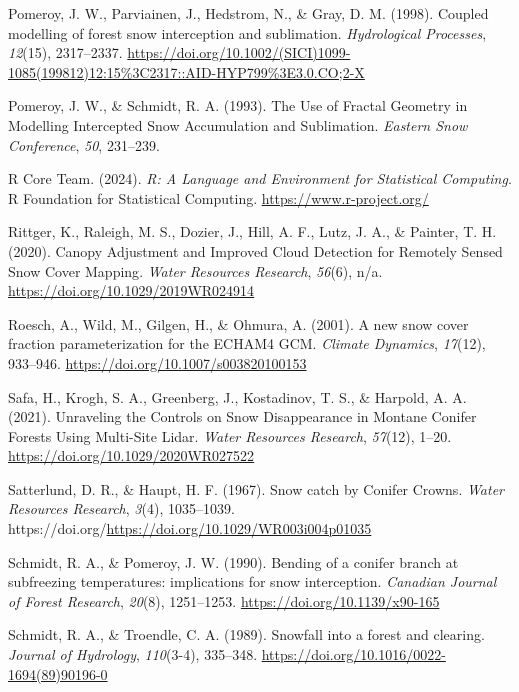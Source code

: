 \documentclass[
  letterpaper,
  DIV=11,
  numbers=noendperiod]{scrartcl}
\newlength{\cslhangindent}
\newenvironment{CSLReferences}[2] %
 {\begin{list}{}{%
  \setlength{\itemindent}{0pt}
  \setlength{\leftmargin}{0pt}
  \setlength{\parsep}{0pt}
  \ifodd #1
   \setlength{\leftmargin}{\cslhangindent}
   \setlength{\itemindent}{-1\cslhangindent}
  \fi
  \setlength{\itemsep}{#2\baselineskip}}}
 {\end{list}}
\begin{document}
\begin{CSLReferences}{1}{0}
Pomeroy, J. W., Parviainen, J., Hedstrom, N., \& Gray, D. M. (1998).
{Coupled modelling of forest snow interception and sublimation}.
\emph{Hydrological Processes}, \emph{12}(15), 2317--2337.
\url{https://doi.org/10.1002/(SICI)1099-1085(199812)12:15\%3C2317::AID-HYP799\%3E3.0.CO;2-X}

Pomeroy, J. W., \& Schmidt, R. A. (1993). {The Use of Fractal Geometry
in Modelling Intercepted Snow Accumulation and Sublimation}.
\emph{Eastern Snow Conference}, \emph{50}, 231--239.

R Core Team. (2024). \emph{{R: A Language and Environment for
Statistical Computing}}. R Foundation for Statistical Computing.
\url{https://www.r-project.org/}

Rittger, K., Raleigh, M. S., Dozier, J., Hill, A. F., Lutz, J. A., \&
Painter, T. H. (2020). {Canopy Adjustment and Improved Cloud Detection
for Remotely Sensed Snow Cover Mapping}. \emph{Water Resources
Research}, \emph{56}(6), n/a. \url{https://doi.org/10.1029/2019WR024914}

Roesch, A., Wild, M., Gilgen, H., \& Ohmura, A. (2001). {A new snow
cover fraction parameterization for the ECHAM4 GCM}. \emph{Climate
Dynamics}, \emph{17}(12), 933--946.
\url{https://doi.org/10.1007/s003820100153}

Safa, H., Krogh, S. A., Greenberg, J., Kostadinov, T. S., \& Harpold, A.
A. (2021). {Unraveling the Controls on Snow Disappearance in Montane
Conifer Forests Using Multi-Site Lidar}. \emph{Water Resources
Research}, \emph{57}(12), 1--20.
\url{https://doi.org/10.1029/2020WR027522}

Satterlund, D. R., \& Haupt, H. F. (1967). {Snow catch by Conifer
Crowns}. \emph{Water Resources Research}, \emph{3}(4), 1035--1039.
https://doi.org/\url{https://doi.org/10.1029/WR003i004p01035}

Schmidt, R. A., \& Pomeroy, J. W. (1990). {Bending of a conifer branch
at subfreezing temperatures: implications for snow interception}.
\emph{Canadian Journal of Forest Research}, \emph{20}(8), 1251--1253.
\url{https://doi.org/10.1139/x90-165}

Schmidt, R. A., \& Troendle, C. A. (1989). {Snowfall into a forest and
clearing}. \emph{Journal of Hydrology}, \emph{110}(3-4), 335--348.
\url{https://doi.org/10.1016/0022-1694(89)90196-0}


\end{CSLReferences}
\end{document}
